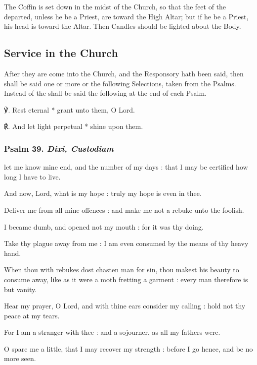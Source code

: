 \begin{rubric}
	The Coffin is set down in the midst of the Church, so that the feet of the departed, unless he be a Priest, are toward the High Altar; but if he be a Priest, his head is toward the Altar. Then Candles should be lighted about the Body.
\end{rubric}

\subsection{Service in the Church}
\begin{rubric}
    After they are come into the Church, and the Responsory hath been said, then shall be said one or more or the following Selections, taken from the Psalms. Instead of the  shall be said the following at the end of each Psalm.
\end{rubric}
℣. Rest eternal * grant unto them, O Lord.\par
℟. And let light perpetual * shine upon them.\par\noindent

\subsubsection{Psalm 39. \textit{Dixi, Custodiam}}
 let me know mine end, and the number of my days : that I may be certified how long I have to live.\par
{}
And now, Lord, what is my hope : truly my hope is even in thee.\par
{}Deliver me from all mine offences : and make me not a rebuke unto the foolish.\par
{}I became dumb, and opened not my mouth : for it was thy doing.\par
{}Take thy plague away from me : I am even consumed by the means of thy heavy hand.\par
{}When thou with rebukes dost chasten man for sin, thou makest his beauty to consume away, like as it were a moth fretting a garment : every man therefore is but vanity.\par
{}Hear my prayer, O Lord, and with thine ears consider my calling : hold not thy peace at my tears.\par
{}For I am a stranger with thee : and a sojourner, as all my fathers were.\par
{}O spare me a little, that I may recover my strength : before I go hence, and be no more seen.\par

